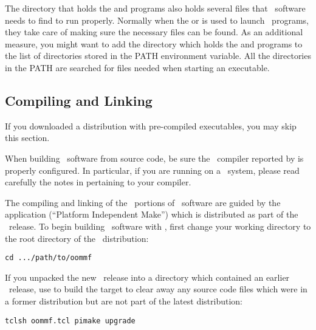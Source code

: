 The directory that holds the  and  programs also
holds several {} files that \OOMMF\ software needs to find to
run properly.  Normally when the  or
 is
used to launch \OOMMF\ programs, they take care of making sure the
necessary {} files can be found.  As an additional measure,
you might want to add the directory which holds the  and
 programs to the list of directories stored in the
PATH environment variable.  All the
directories in the PATH are searched for {} files needed when
starting an executable.  

\subsection{Compiling and Linking}\label{sec:install.compile}

If you downloaded a distribution with pre-compiled executables, you may
skip this section.

When building \OOMMF\ software from source code, be sure the
\Cplusplus\ compiler reported by  is properly
configured.  In particular, if you are running on a \Windows\ system,
please read carefully the notes in  
 pertaining to your compiler.

The compiling and linking of the \Cplusplus\ portions of
\OOMMF\ software are guided by the application
(``Platform Independent Make'') which
is distributed as part of the \OOMMF\ release.
To begin building \OOMMF\ software with , first change
your working directory
to the root directory of the \OOMMF\ distribution:
\begin{verbatim}
cd .../path/to/oommf
\end{verbatim}

If you unpacked the new \OOMMF\ release into a directory 
which contained an earlier \OOMMF\ release,
use  to build the target 
to clear away any source code files which were
in a former distribution but are not part of the latest distribution:
\begin{verbatim}
tclsh oommf.tcl pimake upgrade
\end{verbatim}

